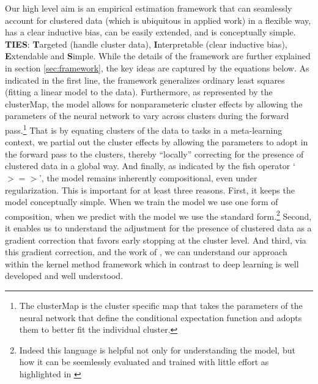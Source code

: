 \documentclass[a4paper,12pt]{article}
\begin{document}
Our high level aim is an empirical estimation framework that can seamlessly account for clustered data (which is ubiquitous in applied work) in a flexible way, has a clear inductive bias, can be easily extended, and is conceptually simple. \textbf{TIES}: \textbf{T}argeted (handle cluster data), \textbf{I}nterpretable (clear inductive bias), \textbf{E}xtendable and \textbf{S}imple. While the details of the framework are further explained in section \ref{sec:framework}, the key ideas are captured by the equations below. As indicated in the first line, the framework generalizes ordinary least squares (fitting a linear model to the data). Furthermore, as represented by the clusterMap, the model allows for nonparameteric cluster effects by allowing the parameters of the neural network to vary across clusters during the forward pass.\footnote{The clusterMap is the cluster specific map that takes the parameters of the neural network that define the conditional expectation function and adopts them to better fit the individual cluster.} That is by equating clusters of the data to tasks in a meta-learning context, we partial out the cluster effects by allowing the parameters to adopt in the forward pass to the clusters, thereby ``locally'' correcting for the presence of clustered data in a global way. And finally, as indicated by the fish operator `$>=>$', the model remains inherently compositional, even under regularization. This is important for at least three reasons. First, it keeps the model conceptually simple. When we train the model we use one form of composition, when we predict with the model we use the standard form.\footnote{Indeed this language is helpful not only for understanding the model, but how it can be seemlessly evaluated and trained with little effort as highlighted in \cite{frostig2018compiling}}  Second, it enables us to understand the adjustment for the presence of clustered data as a gradient correction that favors early stopping at the cluster level. And third, via this gradient correction, and the work of \cite{domingos2020every}, we can understand our approach within the kernel method framework which in contrast to deep learning is well developed and well understood.

\end{document}
